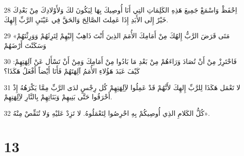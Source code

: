 \par 28 اِحْفَظْ وَاسْمَعْ جَمِيعَ هَذِهِ الكَلِمَاتِ التِي أَنَا أُوصِيكَ بِهَا لِيَكُونَ لكَ وَلأَوْلادِكَ مِنْ بَعْدِكَ خَيْرٌ إِلى الأَبَدِ إِذَا عَمِلتَ الصَّالِحَ وَالحَقَّ فِي عَيْنَيِ الرَّبِّ إِلهِكَ.
\par 29 «مَتَى قَرَضَ الرَّبُّ إِلهُكَ مِنْ أَمَامِكَ الأُمَمَ الذِينَ أَنْتَ ذَاهِبٌ إِليْهِمْ لِتَرِثَهُمْ وَوَرِثْتَهُمْ وَسَكَنْتَ أَرْضَهُمْ
\par 30 فَاحْتَرِزْ مِنْ أَنْ تُصَادَ وَرَاءَهُمْ مِنْ بَعْدِ مَا بَادُوا مِنْ أَمَامِكَ وَمِنْ أَنْ تَسْأَل عَنْ آلِهَتِهِمْ: كَيْفَ عَبَدَ هَؤُلاءِ الأُمَمُ آلِهَتَهُمْ فَأَنَا أَيْضاً أَفْعَلُ هَكَذَا؟
\par 31 لا تَعْمَل هَكَذَا لِلرَّبِّ إِلهِكَ لأَنَّهُمْ قَدْ عَمِلُوا لآِلِهَتِهِمْ كُل رِجْسٍ لدَى الرَّبِّ مِمَّا يَكْرَهُهُ إِذْ أَحْرَقُوا حَتَّى بَنِيهِمْ وَبَنَاتِهِمْ بِالنَّارِ لآِلِهَتِهِمْ.
\par 32 كُلُّ الكَلامِ الذِي أُوصِيكُمْ بِهِ احْرِصُوا لِتَعْمَلُوهُ. لا تَزِدْ عَليْهِ وَلا تُنَقِّصْ مِنْهُ».

\chapter{13}

